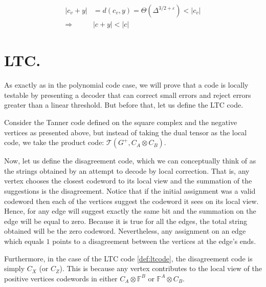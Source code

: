  \begin{equation*}
   \begin{split}
     \left|   c_{v} + y   \right| &= d\left( c_{v}, y  \right) = \Theta\left( \Delta^{3/2 + \varepsilon} \right) < \left|   c_{v}   \right|     \\
     \Rightarrow & | c + y| < |c| 
   \end{split}
 \end{equation*}

 \section{LTC.} 
As exactly as in the polynomial code case, we will prove that a code is locally testable by presenting a decoder that can correct small errors and reject errors greater than a linear threshold. But before that, let us define the LTC code.

\begin{definition}
  \label{def:ltcode}
Consider the Tanner code defined on the square complex and the negative vertices as presented above, but instead of taking the dual tensor as the local code, we take the product code: $\mathcal{T} \left(G^{+}, C_{A} \otimes C_{B} \right)$.
\end{definition}
Now, let us define the disagreement code, which we can conceptually think of as the strings obtained by an attempt to decode by local correction. That is, any vertex chooses the closest codeword to its local view and the summation of the suggestions is the disagreement. Notice that if the initial assignment was a valid codeword then each of the vertices suggest the codeword it sees on its local view. Hence, for any edge will suggest exactly the same bit and the summation on the edge will be equal to zero. Because it is true for all the edges, the total string obtained will be the zero codeword. Nevertheless, any assignment on an edge which equals $1$ points to a disagreement between the vertices at the edge's ends.


Furthermore, in the case of the LTC code \cref{def:ltcode}, the disagreement code is simply $C_X$ (or $C_Z$). This is because any vertex contributes to the local view of the positive vertices codewords in either $C_A \otimes \mathbb{F}^B$ or $\mathbb{F}^A \otimes C_B$. 


